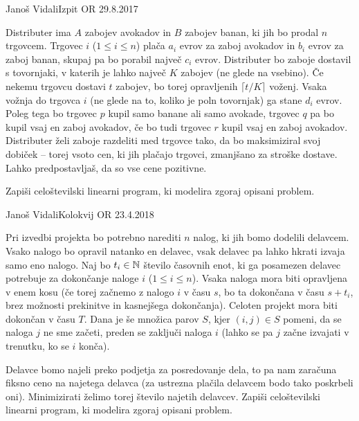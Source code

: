 \begin{naloga}{Janoš Vidali}{Izpit OR 29.8.2017}
\begin{vprasanje}
Distributer ima $A$ zabojev avokadov in $B$ zabojev banan,
ki jih bo prodal $n$ trgovcem.
Trgovec $i$ ($1 \le i \le n$)
plača $a_i$ evrov za zaboj avokadov in $b_i$ evrov za zaboj banan,
skupaj pa bo porabil največ $c_i$ evrov.
Distributer bo zaboje dostavil s tovornjaki,
v katerih je lahko največ $K$ zabojev (ne glede na vsebino).
Če nekemu trgovcu dostavi $t$ zabojev,
bo torej opravljenih $\lceil t/K \rceil$ voženj.
Vsaka vožnja do trgovca $i$ (ne glede na to, koliko je poln tovornjak)
ga stane $d_i$ evrov.
Poleg tega bo trgovec $p$ kupil samo banane ali samo avokade,
trgovec $q$ pa bo kupil vsaj en zaboj avokadov,
če bo tudi trgovec $r$ kupil vsaj en zaboj avokadov.
Distributer želi zaboje razdeliti med trgovce tako,
da bo maksimiziral svoj dobiček
-- torej vsoto cen, ki jih plačajo trgovci,
zmanjšano za stroške dostave.
Lahko predpostavljaš, da so vse cene pozitivne.

Zapiši celoštevilski linearni program, ki modelira zgoraj opisani problem.
\end{vprasanje}
\begin{odgovor}
\end{odgovor}
\end{naloga}


\begin{naloga}{Janoš Vidali}{Kolokvij OR 23.4.2018}
\begin{vprasanje}
Pri izvedbi projekta bo potrebno narediti $n$ nalog,
ki jih bomo dodelili delavcem.
Vsako nalogo bo opravil natanko en delavec,
vsak delavec pa lahko hkrati izvaja samo eno nalogo.
Naj bo $t_i \in \mathbb{N}$ število časovnih enot,
ki ga posamezen delavec potrebuje za dokončanje naloge $i$
($1 \le i \le n$).
Vsaka naloga mora biti opravljena v enem kosu
(če torej začnemo z nalogo $i$ v času $s$,
bo ta dokončana v času $s+t_i$,
brez možnosti prekinitve in kasnejšega dokončanja).
Celoten projekt mora biti dokončan v času $T$.
Dana je še množica parov $S$,
kjer $(i, j) \in S$ pomeni,
da se naloga $j$ ne sme začeti, preden se zaključi naloga $i$
(lahko se pa $j$ začne izvajati v trenutku, ko se $i$ konča).

Delavce bomo najeli preko podjetja za posredovanje dela,
to pa nam zaračuna fiksno ceno na najetega delavca
(za ustrezna plačila delavcem bodo tako poskrbeli oni).
Minimizirati želimo torej število najetih delavcev.
Zapiši celoštevilski linearni program, ki modelira zgoraj opisani problem.
\end{vprasanje}
\begin{odgovor}
\end{odgovor}
\end{naloga}


